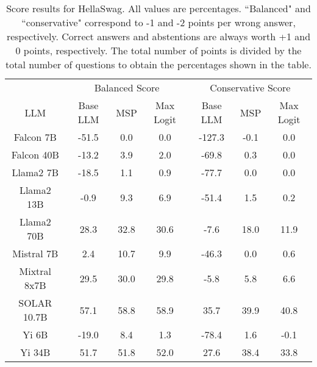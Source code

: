 \begin{table*}
\centering
\begin{tabular}{c|c|c|c|c|c|c}
& \multicolumn{3}{c|}{Balanced Score} & \multicolumn{3}{c}{Conservative Score} \\ 
LLM & Base LLM & MSP & Max Logit & Base LLM & MSP & Max Logit\\ \hline
Falcon 7B & -51.5 & 0.0 & 0.0 & -127.3 & -0.1 & 0.0\\
Falcon 40B & -13.2 & 3.9 & 2.0 & -69.8 & 0.3 & 0.0\\
Llama2 7B & -18.5 & 1.1 & 0.9 & -77.7 & 0.0 & 0.0\\
Llama2 13B & -0.9 & 9.3 & 6.9 & -51.4 & 1.5 & 0.2\\
Llama2 70B & 28.3 & 32.8 & 30.6 & -7.6 & 18.0 & 11.9\\
Mistral 7B & 2.4 & 10.7 & 9.9 & -46.3 & 0.0 & 0.6\\
Mixtral 8x7B & 29.5 & 30.0 & 29.8 & -5.8 & 5.8 & 6.6\\
SOLAR 10.7B & 57.1 & 58.8 & 58.9 & 35.7 & 39.9 & 40.8\\
Yi 6B & -19.0 & 8.4 & 1.3 & -78.4 & 1.6 & -0.1\\
Yi 34B & 51.7 & 51.8 & 52.0 & 27.6 & 38.4 & 33.8\\
\hline
\end{tabular}
\caption{Score results for HellaSwag. All values are percentages. ``Balanced" and ``conservative" correspond to -1 and -2 points per wrong answer, respectively. Correct answers and abstentions are always worth +1 and 0 points, respectively. The total number of points is divided by the total number of questions to obtain the percentages shown in the table.}
\label{tab:hellaswag_score}
\end{table*}

